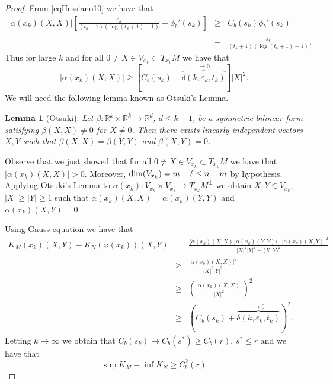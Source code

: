 \documentclass[a4paper]{amsart}
\newtheorem{lemma}{Lemma}
\begin{document}
\begin{proof}
From \eqref{eqHessiano10} we have that 
\begin{eqnarray*}\vert \alpha(x_k) (X,X)\vert \left[ \frac{\varepsilon_k}{(t_k +1)(\log (t_k+1)+1)} + \phi_{b}'(s_k)\right]&\geq&  C_{b}(s_k)\phi_{b}'(s_k)\\
&& \\
&-& \frac{\varepsilon_k}{(t_k+1)(\log (t_k+1)+1)} .
\end{eqnarray*}
Thus  for  large $k$ and for all $0\neq X\in  V_{x_k}\subset T_{x_k}M$ we have that 
$$\vert\alpha (x_k)(X,X)\vert \geq  \left[C_b(s_k)+ \stackrel{\to 0 }{\overbrace{\delta (k, \varepsilon_k, t_k)}}\right]\vert X\vert^{2}.$$ We will need the following lemma known as Otsuki's Lemma. \begin{lemma}[Otsuki] Let $ \beta \colon \mathbb{R}^{k}\times\mathbb{R}^k \rightarrow \mathbb{R}^d $, $ d \leq k-1 $, be a symmetric bilinear form satisfying $ \beta(X,X)\neq 0 $ for $ X\neq 0 $. Then there exists linearly independent vectors $ X,Y $ such that $\beta(X,X)=\beta(Y,Y) $ and $ \beta(X,Y)=0 $.
\end{lemma} Observe that we just showed that for all $0\neq X\in  V_{x_k}\subset T_{x_k}M$ we have that $\vert\alpha (x_k)(X,X)\vert > 0. $ Moreover, ${\rm dim}(V_{x_k})=m-\ell \leq n-m$ by hypothesis. Applying Otsuki's Lemma to $\alpha (x_k)\colon  V_{x_k}\times V_{x_k}\to T_{x_k}M^{\perp}$ we obtain $X, Y\in V_{x_k}$, $\vert X\vert \geq \vert Y\vert \geq 1$ such that $\alpha (x_k)(X,X)= \alpha (x_k)(Y,Y)$ and $\alpha (x_k)(X,Y)=0$.

Using Gauss equation we have that 
\begin{eqnarray}\label{curvaturek}
K_{M}(x_k)(X,Y) - K_{N}(\varphi(x_k))(X,Y) &=& \frac{\langle \alpha (x_k)(X,X),\alpha (x_k)(Y,Y)\rangle - \vert \alpha (x_k)(X,Y)\vert^{2} }{\vert X\vert^{2}\vert Y\vert^{2} - \langle X,Y\rangle^{2}} \nonumber \\
&\geq & \frac{\vert \alpha (x_k)(X,X)\vert^{2}}{\vert X\vert^{2}\vert Y\vert^{2}} \nonumber \\
&\geq & \left(\frac{\vert \alpha (x_k)(X,X)\vert }{\vert X\vert^{2}}\right)^{2}\nonumber \\
&\geq &  \left(C_{b}(s_k)+ \stackrel{\to 0 }{\overbrace{\delta (k, \varepsilon_k, t_k)}}\right)^{2}.
\end{eqnarray}Letting $k\to\infty$ we obtain that $C_b(s_k)\to C_{b}(s^{\ast})\geq C_{b}(r)$, $s^{\ast}\leq r$ and we have that $$ \sup K_{M}-\inf K_{N}\geq C_{b}^{2}(r)$$


\end{proof}
\end{document}
